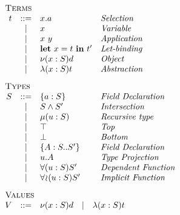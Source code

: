 \begin{minipage}[t]{.5\textwidth}\[\begin{array}{r c l l}
    \multicolumn{4}{l}{\textsc{Terms}}                      \\
    t & ::= & x.a             & \textit{Selection         } \\
      &  |  & x               & \textit{Variable          } \\
      &  |  & x\ y            & \textit{Application       } \\
      &  |  & \LET{x}{t}{t'}  & \textit{Let-binding       } \\
      &  |  & \OBJ{x}{S}{d}   & \textit{Object            } \\
      &  |  & \ABS{x}{S}{t}   & \textit{Abstraction       } \\[3mm]
    \multicolumn{4}{l}{\textsc{Types}}                      \\
    S & ::= & \FDEC{a}{S}     & \textit{Field Declaration } \\
      &  |  & \AGG{S}{S'}     & \textit{Intersection      } \\
      &  |  & \REC{u}{S}      & \textit{Recursive type    } \\
      &  |  & \top            & \textit{Top               } \\
      &  |  & \bot            & \textit{Bottom            } \\
      &  |  & \TDEC{A}{S}{S'} & \textit{Field Declaration } \\
      &  |  & u.A             & \textit{Type Projection   } \\
      &  |  & \DFUN{u}{S}{S'} & \textit{Dependent Function} \\
      &  |  & \IFUN{u}{S}{S'} & \textit{Implicit Function } \\[3mm]
    \multicolumn{4}{l}{\textsc{Values}} \\
    V & ::= & \multicolumn{2}{l}{\OBJ{x}{S}{d}
        \quad | \quad \ABS{x}{S}{t}} \\[3mm]
\end{array}\]\end{minipage}
